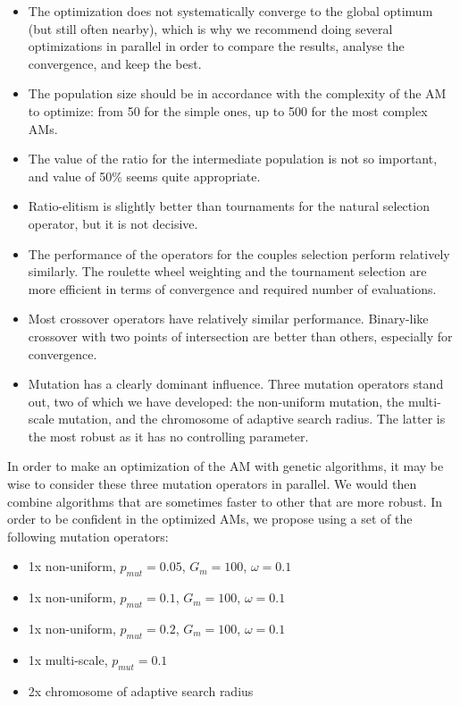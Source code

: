 \documentclass[twocol]{ametsoc}
\begin{document}
\begin{itemize}
	\item The optimization does not systematically converge to the global optimum  (but still often nearby), which is why we recommend doing several optimizations in parallel in order to compare the results, analyse the convergence, and keep the best.
	
	\item The population size should be in accordance with the complexity of the AM to optimize: from 50 for the simple ones, up to 500 for the most complex AMs.
	
	\item The value of the ratio for the intermediate population is not so important, and value of 50\% seems quite appropriate.
	
	\item Ratio-elitism is slightly better than tournaments for the natural selection operator, but it is not decisive.
	
	\item The performance of the operators for the couples selection perform relatively similarly. The roulette wheel weighting and the tournament selection are more efficient in terms of convergence and required number of evaluations.
	
	\item Most crossover operators have relatively similar performance. Binary-like crossover with two points of intersection are better than others, especially for convergence.
	
	\item Mutation has a clearly dominant influence. Three mutation operators stand out, two of which we have developed: the non-uniform mutation, the multi-scale mutation, and the chromosome of adaptive search radius. The latter is the most robust as it has no controlling parameter.
	
\end{itemize}

In order to make an optimization of the AM with genetic algorithms, it may be wise to consider these three mutation operators in parallel. We would then combine algorithms that are sometimes faster to other that are more robust. In order to be confident in the optimized AMs, we propose using a set of the following mutation operators:

\begin{itemize}
	\setlength\itemsep{-4px}
	\item 1x non-uniform, $p_{mut}=0.05$, $G_{m}=100$, $\omega=0.1$
	\item 1x non-uniform, $p_{mut}=0.1$, $G_{m}=100$, $\omega=0.1$
	\item 1x non-uniform, $p_{mut}=0.2$, $G_{m}=100$, $\omega=0.1$
	\item 1x multi-scale,  $p_{mut}=0.1$
	\item 2x chromosome of adaptive search radius
\end{itemize}
\end{document}
